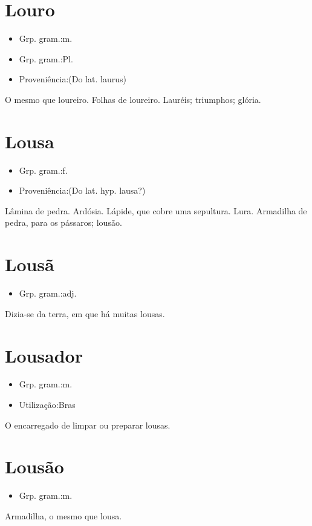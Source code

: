 \section{Louro}
\begin{itemize}
\item {Grp. gram.:m.}
\end{itemize}
\begin{itemize}
\item {Grp. gram.:Pl.}
\end{itemize}
\begin{itemize}
\item {Proveniência:(Do lat. \textunderscore laurus\textunderscore )}
\end{itemize}
O mesmo que \textunderscore loureiro\textunderscore .
Folhas de loureiro.
Lauréis; triumphos; glória.
\section{Lousa}
\begin{itemize}
\item {Grp. gram.:f.}
\end{itemize}
\begin{itemize}
\item {Proveniência:(Do lat. hyp. \textunderscore lausa\textunderscore ?)}
\end{itemize}
Lâmina de pedra.
Ardósia.
Lápide, que cobre uma sepultura.
Lura.
Armadilha de pedra, para os pássaros; lousão.
\section{Lousã}
\begin{itemize}
\item {Grp. gram.:adj.}
\end{itemize}
Dizia-se da terra, em que há muitas lousas.
\section{Lousador}
\begin{itemize}
\item {Grp. gram.:m.}
\end{itemize}
\begin{itemize}
\item {Utilização:Bras}
\end{itemize}
O encarregado de limpar ou preparar lousas.
\section{Lousão}
\begin{itemize}
\item {Grp. gram.:m.}
\end{itemize}
Armadilha, o mesmo que \textunderscore lousa\textunderscore .
